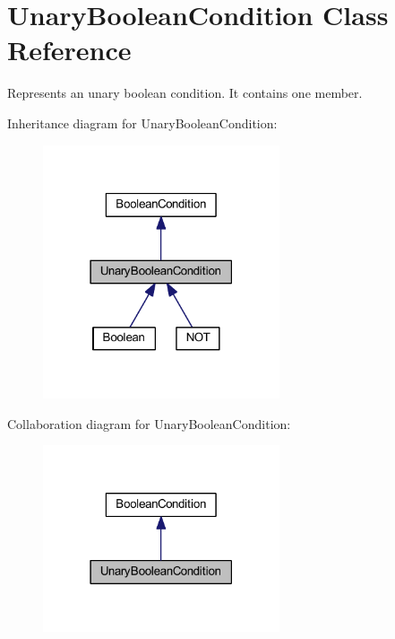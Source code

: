 \hypertarget{class_unary_boolean_condition}{\section{Unary\-Boolean\-Condition Class Reference}
\label{class_unary_boolean_condition}
}


Represents an unary boolean condition. It contains one member.  




Inheritance diagram for Unary\-Boolean\-Condition\-:\nopagebreak
\begin{figure}[H]
\begin{center}
\leavevmode
\includegraphics[width=198pt]{class_unary_boolean_condition__inherit__graph}
\end{center}
\end{figure}


Collaboration diagram for Unary\-Boolean\-Condition\-:\nopagebreak
\begin{figure}[H]
\begin{center}
\leavevmode
\includegraphics[width=198pt]{class_unary_boolean_condition__coll__graph}
\end{center}
\end{figure}
